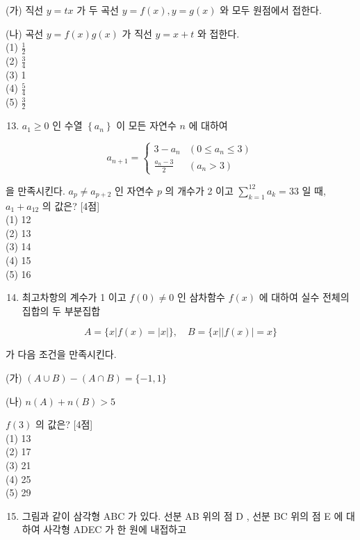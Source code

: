 \documentclass[10pt]{article}
\begin{document}
(가) 직선 \(y=t x\) 가 두 곡선 \(y=f(x), y=g(x)\) 와 모두 원점에서 접한다.

(나) 곡선 \(y=f(x) g(x)\) 가 직선 \(y=x+t\) 와 접한다.\\
(1) \(\frac{1}{2}\)\\
(2) \(\frac{3}{4}\)\\
(3) 1\\
(4) \(\frac{5}{4}\)\\
(5) \(\frac{3}{2}\)

\begin{enumerate}
  \setcounter{enumi}{12}
  \item \(a_{1} \geq 0\) 인 수열 \(\left\{a_{n}\right\}\) 이 모든 자연수 \(n\) 에 대하여
\end{enumerate}

\[
a_{n+1}= \begin{cases}3-a_{n} & \left(0 \leq a_{n} \leq 3\right) \\ \frac{a_{n}-3}{2} & \left(a_{n}>3\right)\end{cases}
\]

을 만족시킨다. \(a_{p} \neq a_{p+2}\) 인 자연수 \(p\) 의 개수가 2 이고 \(\sum_{k=1}^{12} a_{k}=33\) 일 때, \(a_{1}+a_{12}\) 의 값은? [4점]\\
(1) 12\\
(2) 13\\
(3) 14\\
(4) 15\\
(5) 16

\begin{enumerate}
  \setcounter{enumi}{13}
  \item 최고차항의 계수가 1 이고 \(f(0) \neq 0\) 인 삼차함수 \(f(x)\) 에 대하여 실수 전체의 집합의 두 부분집합
\end{enumerate}

\[
A=\{x|f(x)=| x \mid\}, \quad B=\{x|| f(x) \mid=x\}
\]

가 다음 조건을 만족시킨다.

(가) \((A \cup B)-(A \cap B)=\{-1,1\}\)

(나) \(n(A)+n(B)>5\)

\(f(3)\) 의 값은? [4점]\\
(1) 13\\
(2) 17\\
(3) 21\\
(4) 25\\
(5) 29

\begin{enumerate}
  \setcounter{enumi}{14}
  \item 그림과 같이 삼각형 ABC 가 있다. 선분 AB 위의 점 D , 선분 BC 위의 점 E 에 대하여 사각형 ADEC 가 한 원에 내접하고
\end{enumerate}
\end{document}

